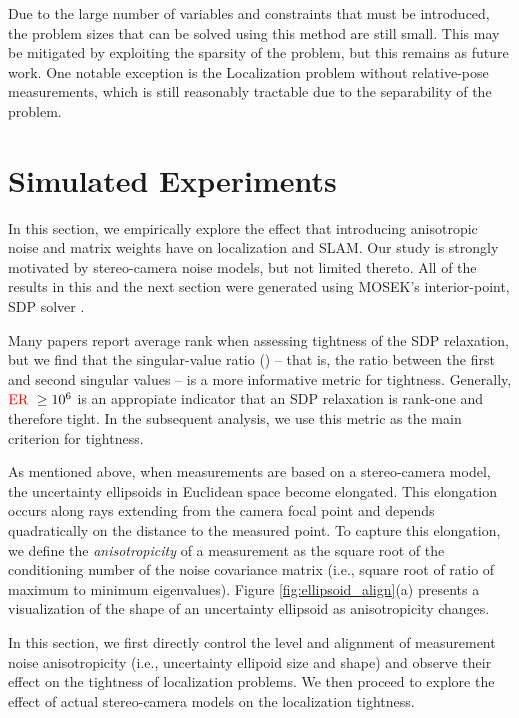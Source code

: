 \documentclass[lettersize,journal]{IEEEtran}
\newcommand{\rev}[1]{\color{red}{#1}\color{black}}
\begin{document}
{Due to the large number of variables and constraints that must be introduced, the problem sizes that can be solved using this method are still small. This may be mitigated by exploiting the sparsity of the problem, but this remains as future work. One notable exception is the Localization problem without relative-pose measurements, which is still reasonably tractable due to the separability of the problem.
}

\section{Simulated Experiments}\label{sec:Simulations}

In this section, we empirically explore the effect that introducing anisotropic noise and matrix weights have on localization and SLAM. Our study is strongly motivated by stereo-camera noise models, but not limited thereto. All of the results in this and the next section were generated using MOSEK's interior-point, SDP solver \cite{mosek}.

Many papers report average rank when assessing tightness of the SDP relaxation, but we find that the singular-value ratio (\rev{ER }) -- that is, the ratio between the first and second singular values -- is a more informative metric for tightness. Generally, $\mbox{\rev{ER }}\geq 10^6$ is an appropiate indicator that an SDP relaxation is rank-one and therefore tight. In the subsequent analysis, we use this metric as the main criterion for tightness. 

As mentioned above, when measurements are based on a stereo-camera model, the uncertainty ellipsoids in Euclidean space become elongated. This elongation occurs along rays extending from the camera focal point and depends quadratically on the distance to the measured point. To capture this elongation, we define the \textit{anisotropicity} of a measurement as the square root of the conditioning number of the noise covariance matrix (i.e., square root of ratio of maximum to minimum eigenvalues). Figure \ref{fig:ellipsoid_align}(a) presents a visualization of the shape of an uncertainty ellipsoid as anisotropicity changes.

In this section, we first directly control the level and alignment of measurement noise anisotropicity (i.e., uncertainty ellipoid size and shape) and observe their effect on the tightness of localization problems. We then proceed to explore the effect of actual stereo-camera models on the localization tightness.  
\end{document}
